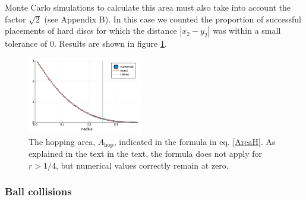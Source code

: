\documentclass[superscriptaddress,pre,reprint,showpacs,twocolumn]{revtex4-1}
\begin{document}
Monte Carlo simulations to calculate this area must also
take into account the factor $\sqrt{2}$ (see Appendix B).
In this case we counted the proportion of successful placements of hard discs 
for which the distance 
$|x_2 - y_2|$ was within a small tolerance of $0$. 
Results are shown in figure \ref{AreaHopp01}.


\begin{figure}[h]
\centering
\includegraphics[width=0.45\textwidth]{./figures/areaHopvertical01.pdf}
\caption{The hopping area, $A_\text{hop}$, 
  indicated in the formula in eq. \ref{AreaH}. As explained in the text
in the text, the formula does not apply for $r>1/4$, but numerical values correctly
remain at zero.}
\label{AreaHopp01}
\end{figure}


\subsubsection{Ball collisions}
\end{document}

